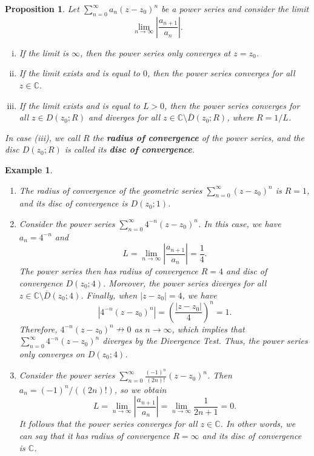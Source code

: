 \documentclass[10pt]{article}
\newcommand{\C}{\mathbb{C}}
\theoremstyle{newstyle}
\newtheorem{prop}[thm]{Proposition}
\newtheorem{exmp}[thm]{Example}
\begin{document}
\begin{prop}
Let $\sum_{n=0}^\infty a_n(z-z_0)^n$ be a power series and consider the limit 
\[ \lim_{n\to\infty} \left| \frac{a_{n+1}}{a_n} \right|. \]
\begin{enumerate}[(i)]
    \item If the limit is $\infty$, then the power series only converges at $z = z_0$.
    \item If the limit exists and is equal to $0$, then the power series converges for all $z \in \C$.
    \item If the limit exists and is equal to $L > 0$, then the power series converges for all 
    $z \in D(z_0; R)$ and diverges for all $z \in \C \setminus \overline{D}(z_0; R)$, where 
    $R = 1/L$. 
\end{enumerate}
In case (iii), we call $R$ the {\bf radius of convergence} of the power series,
and the disc $D(z_0; R)$ is called its {\bf disc of convergence}. 
\end{prop}

\begin{exmp}~
\begin{enumerate}[(1)]
    \item The radius of convergence of the geometric series $\sum_{n=0}^\infty (z-z_0)^n$ is $R=1$, 
    and its disc of convergence is $D(z_0; 1)$. 
    \item Consider the power series $\sum_{n=0}^\infty 4^{-n}(z-z_0)^n$. In this case, we have 
    $a_n = 4^{-n}$ and 
    \[ L = \lim_{n\to\infty} \left| \frac{a_{n+1}}{a_n} \right| = \frac14. \]
    The power series then has radius of convergence $R = 4$ and disc of convergence $D(z_0; 4)$. 
    Moreover, the power series diverges for all $z \in \C \setminus \overline{D}(z_0; 4)$. 
    Finally, when $|z - z_0| = 4$, we have 
    \[ |4^{-n}(z-z_0)^n| = \left( \frac{|z-z_0|}4 \right)^n = 1. \]
    Therefore, $4^{-n}(z-z_0)^n \nrightarrow 0$ as $n \to \infty$, which implies that 
    $\sum_{n=0}^\infty 4^{-n}(z-z_0)^n$ diverges by the Divergence Test. Thus, the 
    power series only converges on $D(z_0; 4)$. 
    \item Consider the power series $\sum_{n=0}^\infty \frac{(-1)^n}{(2n)!}(z-z_0)^n$. 
    Then $a_n = (-1)^n/((2n)!)$, so we obtain 
    \[ L = \lim_{n\to\infty} \left| \frac{a_{n+1}}{a_n} \right| = \lim_{n\to\infty} \frac{1}{2n+1} = 0. \]
    It follows that the power series converges for all $z \in \C$. In other words, we can say that 
    it has radius of convergence $R = \infty$ and its disc of convergence is $\C$. 
\end{enumerate}
\end{exmp}
\end{document}
